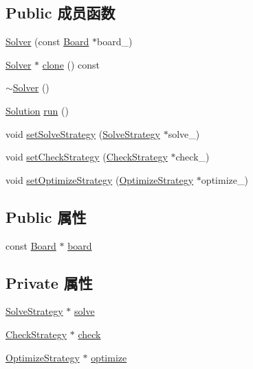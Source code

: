 \subsection*{Public 成员函数}
\begin{DoxyCompactItemize}
\item 
\hyperlink{classSolver_aa700448cac8f07eda6adccc6c79c4b9e}{Solver} (const \hyperlink{classBoard}{Board} $\ast$board\+\_\+)
\item 
\hyperlink{classSolver}{Solver} $\ast$ \hyperlink{classSolver_a1a6f0075358685b01c83188d206e41a5}{clone} () const 
\item 
\hyperlink{classSolver_aba52d3c92fafceb6fe39f937f2d73db3}{$\sim$\+Solver} ()
\item 
\hyperlink{classSolution}{Solution} \hyperlink{classSolver_ac0b51cb3578988fe9c461ea3fc424bef}{run} ()
\item 
void \hyperlink{classSolver_a2b07dd3c581eeb3207036430082cb2f9}{set\+Solve\+Strategy} (\hyperlink{classSolveStrategy}{Solve\+Strategy} $\ast$solve\+\_\+)
\item 
void \hyperlink{classSolver_a1a0ef339f8da3d56acea8b5a0d50d701}{set\+Check\+Strategy} (\hyperlink{classCheckStrategy}{Check\+Strategy} $\ast$check\+\_\+)
\item 
void \hyperlink{classSolver_a9917ba104c1daf8d9104e1892b480c2f}{set\+Optimize\+Strategy} (\hyperlink{classOptimizeStrategy}{Optimize\+Strategy} $\ast$optimize\+\_\+)
\end{DoxyCompactItemize}
\subsection*{Public 属性}
\begin{DoxyCompactItemize}
\item 
const \hyperlink{classBoard}{Board} $\ast$ \hyperlink{classSolver_a8966a22c2f247addc8ce453d119bc54e}{board}
\end{DoxyCompactItemize}
\subsection*{Private 属性}
\begin{DoxyCompactItemize}
\item 
\hyperlink{classSolveStrategy}{Solve\+Strategy} $\ast$ \hyperlink{classSolver_a2da9746bdd69a8ae76bb519bb1bc95b3}{solve}
\item 
\hyperlink{classCheckStrategy}{Check\+Strategy} $\ast$ \hyperlink{classSolver_af9c1ccc9336ccdee35dcc7c1c0e39a95}{check}
\item 
\hyperlink{classOptimizeStrategy}{Optimize\+Strategy} $\ast$ \hyperlink{classSolver_a030d66f9899352a9c96313801ae58b8a}{optimize}
\end{DoxyCompactItemize}


